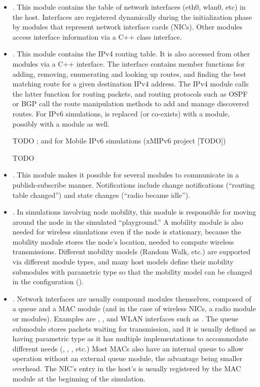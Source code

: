 \begin{itemize}

\item {}. This module
contains the table of network interfaces (eth0, wlan0, etc) in the host.
Interfaces are registered dynamically during the initialization phase by
modules that represent network interface cards (NICs). Other modules access
interface information via a C++ class interface.

\item {}. This module contains
the IPv4 routing table. It is also accessed from other modules via a C++ interface.
The interface contains member functions for adding, removing, enumerating
and looking up routes, and finding the best matching route for a given
destination IPv4 address. The IPv4 module calls the latter function for
routing packets, and routing protocols such as OSPF or BGP call the route
manipulation methods to add and manage discovered routes. For IPv6
simulations,  is replaced (or co-exists) with
a  module, possibly with a 
module as well.

\ifdraft TODO
; and for Mobile IPv6 simulations (xMIPv6 project [TODO])
\fi

\ifdraft TODO
\item {}. This module
makes it possible for several modules to communicate in a publish-subscribe
manner. Notifications include change notifications (``routing table
changed'') and state changes (``radio became idle'').
\fi

\item {}. In simulations involving node mobility, this
module is responsible for moving around the node in the simulated
``playground.'' A mobility module is also needed for wireless simulations
even if the node is stationary, because the mobility module stores the
node's location, needed to compute wireless transmissions. Different
mobility models (Random Walk, etc.) are supported via different module
types, and many host models define their mobility submodules with
parametric type so that the mobility model can be changed in the
configuration ().

\item {}. Network interfaces are usually compound modules
themselves, composed of a queue and a MAC module (and in the case of
wireless NICs, a radio module or modules). Examples are
, , and WLAN interfaces
such as . The queue submodule stores packets
waiting for transmission, and it is usually defined as having parametric
type as it has multiple implementations to accommodate different needs
(, , ,
etc.) Most MACs also have an internal queue to allow operation without an
external queue module, the advantage being smaller overhead. The NIC's
entry in the host's  is usually registered by the
MAC module at the beginning of the simulation.


\end{itemize}
